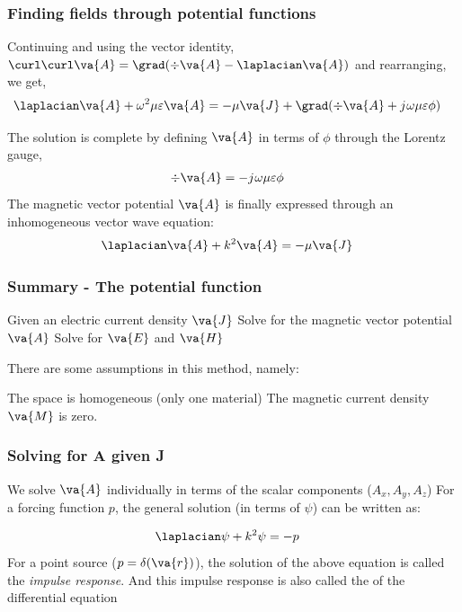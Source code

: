 \documentclass[10pt, compress]{beamer}
\renewcommand{\O}{\omega}  %
\newcommand{\E}{\varepsilon}  %
\renewcommand{\u}{\mu}  %
\renewcommand{\j}{{j}\mkern1mu} %
\begin{document}
\begin{frame}
    \frametitle{Finding fields through potential functions}
  Continuing and using the vector identity,
  $\curl \curl \va{A} = \grad ( \div  \va{A} - \laplacian \va{A})$
  and rearranging, we get,
  \begin{align*}
    \laplacian \va{A} + \O^2 \u \E \va{A} &= -\u \va{J} + \grad (\div \va{A} +  \j \O \u \E \phi)
  \end{align*}

The solution is complete by defining $\va{A}$ in terms of $\phi$ through the Lorentz gauge,
\begin{align*}
  \div \va{A} &= - \j \O \u \E \phi
\end{align*}
The magnetic vector potential $\va{A}$ is finally expressed through an inhomogeneous vector wave equation:
\begin{align*}
  \laplacian \va{A} + k^2 \va{A} &= -\u \va{J}
\end{align*}
\end{frame}

\begin{frame}
  \frametitle{Summary - The potential function}
  \begin{outline}
    \1 Given an electric current density $\va{J}$
    \1 Solve for the magnetic vector potential $\va{A}$
    \2 Solve for $\va{E}$ and $\va{H}$
  \end{outline}
  There are some assumptions in this method, namely:
  \begin{outline}
    \1 The space is homogeneous (only one material)
    \1 The magnetic current density $\va{M}$ is zero.
  \end{outline}
\end{frame}


\begin{frame}
  \frametitle{Solving for A given J}
  \begin{outline}
    \1 We solve $\va{A}$ individually in terms of the scalar components ($A_x, A_y, A_z$)
    \1 For a forcing function $p$, the general solution (in terms of $\psi$) can be written as:
  \end{outline}
  \begin{align}
    \laplacian \psi + k^2 \psi &= -p
    \label{eq:scalar_func}
  \end{align}
  For a point source ($p = \delta(\va{r})$), the solution of the above equation is called the \textit{impulse response}. And this impulse response is also called the \color{red}{Green function} of the differential equation
\end{frame}
\end{document}
